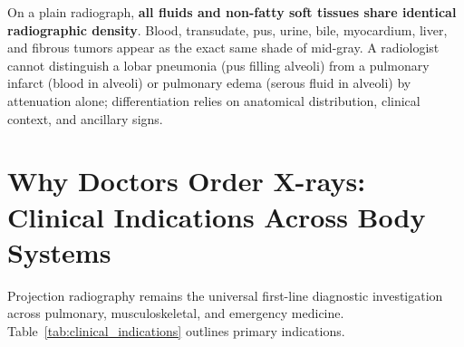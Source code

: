 \documentclass[11pt,a4paper]{article}
\begin{document}
\begin{clinicalpearl}
On a plain radiograph, \textbf{all fluids and non-fatty soft tissues share identical radiographic density}. Blood, transudate, pus, urine, bile, myocardium, liver, and fibrous tumors appear as the exact same shade of mid-gray. A radiologist cannot distinguish a lobar pneumonia (pus filling alveoli) from a pulmonary infarct (blood in alveoli) or pulmonary edema (serous fluid in alveoli) by attenuation alone; differentiation relies on anatomical distribution, clinical context, and ancillary signs.
\end{clinicalpearl}

\section{Why Doctors Order X-rays: Clinical Indications Across Body Systems}

Projection radiography remains the universal first-line diagnostic investigation across pulmonary, musculoskeletal, and emergency medicine. Table~\ref{tab:clinical_indications} outlines primary indications.
\end{document}

